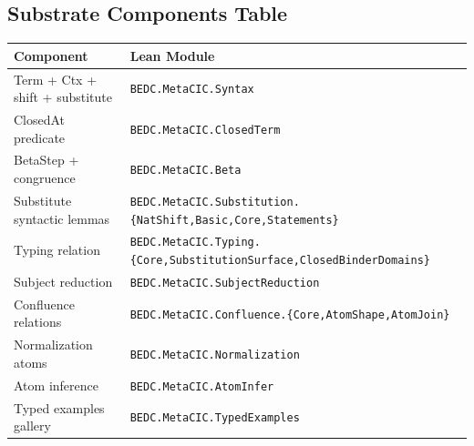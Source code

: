 \subsection{Substrate Components Table}\label{subsec:reconstruction-substrate-components-table}

\begin{tabular}{l l}
\hline
Component & Lean Module \\
\hline
Term + Ctx + shift + substitute & \verb|BEDC.MetaCIC.Syntax| \\
ClosedAt predicate & \verb|BEDC.MetaCIC.ClosedTerm| \\
BetaStep + congruence & \verb|BEDC.MetaCIC.Beta| \\
Substitute syntactic lemmas & \verb|BEDC.MetaCIC.Substitution.{NatShift,Basic,Core,Statements}| \\
Typing relation & \verb|BEDC.MetaCIC.Typing.{Core,SubstitutionSurface,ClosedBinderDomains}| \\
Subject reduction & \verb|BEDC.MetaCIC.SubjectReduction| \\
Confluence relations & \verb|BEDC.MetaCIC.Confluence.{Core,AtomShape,AtomJoin}| \\
Normalization atoms & \verb|BEDC.MetaCIC.Normalization| \\
Atom inference & \verb|BEDC.MetaCIC.AtomInfer| \\
Typed examples gallery & \verb|BEDC.MetaCIC.TypedExamples| \\
\hline
\end{tabular}
